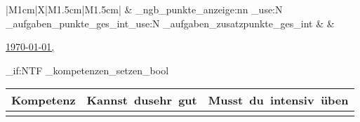 {\begin{center}
\begin{tabularx}{\textwidth}{|M{1cm}|X|M{1.5cm}|M{1.5cm}|}
			 & \_ngb_punkte_anzeige:nn {\int_use:N \schule_aufgaben_punkte_ges_int}{\int_use:N \schule_aufgaben_zusatzpunkte_ges_int} & \tabularnewline\hline
			 &  \tabularnewline\hline
		\end{tabularx}
	\end{center}

	\begin{flushright}
		\underline{\today, \hspace{3cm}}
	\end{flushright}
	
	\notenverteilung
	
	\bool_if:NTF \ngb_kompetenzen_setzen_bool {
	\begin{center}
		\renewcommand{\arraystretch}{1.2}
		\begin{tabularx}{\textwidth}{|m{9cm}|X>{\raggedleft\arraybackslash}m{1.5cm}|} \hline
			\rowcolor{black!20}
			Kompetenz & \tiny Kannst~du\newline sehr~gut & \tiny Musst~du~intensiv~üben \\ \hline \hline
			\ngb@aKECode
		\end{tabularx}
	\end{center}
	}{}
	
%	
	\clearpage
}


\ExplSyntaxOff
